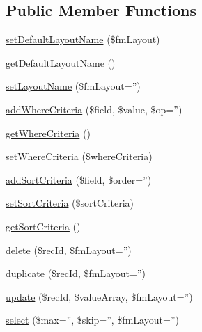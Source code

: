 \subsection*{Public Member Functions}
\begin{DoxyCompactItemize}
\item 
\hyperlink{classrjakes_1_1_rjakes_simple_f_m_1_1_facade_a8e9ea0399f612f4a71263951b8d6f058}{set\+Default\+Layout\+Name} (\$fm\+Layout)
\item 
\hyperlink{classrjakes_1_1_rjakes_simple_f_m_1_1_facade_a1467f08efbf646b4487ae46e72489239}{get\+Default\+Layout\+Name} ()
\item 
\hyperlink{classrjakes_1_1_rjakes_simple_f_m_1_1_facade_a4f4ab5b6d37499d3968b93f08e572fc9}{set\+Layout\+Name} (\$fm\+Layout='')
\item 
\hyperlink{classrjakes_1_1_rjakes_simple_f_m_1_1_facade_a2411e5996335b94ed1a325fdedb9dadf}{add\+Where\+Criteria} (\$field, \$value, \$op='')
\item 
\hyperlink{classrjakes_1_1_rjakes_simple_f_m_1_1_facade_ac38bd479da8e3f37484162106d7643e3}{get\+Where\+Criteria} ()
\item 
\hyperlink{classrjakes_1_1_rjakes_simple_f_m_1_1_facade_aae54bb0e269e03e74b14279640de752d}{set\+Where\+Criteria} (\$where\+Criteria)
\item 
\hyperlink{classrjakes_1_1_rjakes_simple_f_m_1_1_facade_add6d4607365ff180fdf20094a5e50217}{add\+Sort\+Criteria} (\$field, \$order='')
\item 
\hyperlink{classrjakes_1_1_rjakes_simple_f_m_1_1_facade_a2e8f539709d5df677aa7827d89812a13}{set\+Sort\+Criteria} (\$sort\+Criteria)
\item 
\hyperlink{classrjakes_1_1_rjakes_simple_f_m_1_1_facade_a7461a494a7f33e439de0faccc6ff1b69}{get\+Sort\+Criteria} ()
\item 
\hyperlink{classrjakes_1_1_rjakes_simple_f_m_1_1_facade_a897a2e727662afedbe8ba63be9b23f1e}{delete} (\$rec\+Id, \$fm\+Layout='')
\item 
\hyperlink{classrjakes_1_1_rjakes_simple_f_m_1_1_facade_a7d04dbb9678b35646853cd186bfc6ed3}{duplicate} (\$rec\+Id, \$fm\+Layout='')
\item 
\hyperlink{classrjakes_1_1_rjakes_simple_f_m_1_1_facade_a20d42898dc5e473f6ac64b2373630ef4}{update} (\$rec\+Id, \$value\+Array, \$fm\+Layout='')
\item 
\hyperlink{classrjakes_1_1_rjakes_simple_f_m_1_1_facade_adba41108fef3c0f2f695f3852b1411d5}{select} (\$max='', \$skip='', \$fm\+Layout='')
\item 

\end{DoxyCompactItemize}
